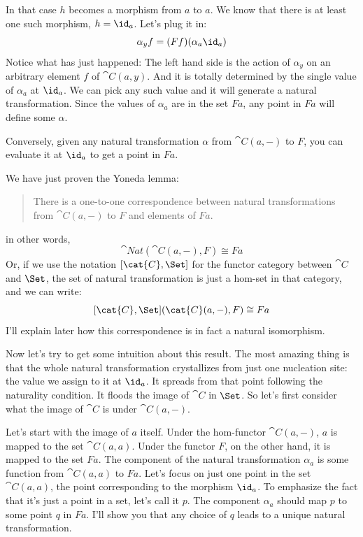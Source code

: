 \noindent
In that case $h$ becomes a morphism from $a$ to
$a$. We know that there is at least one such morphism,
$h = \id_a$. Let's plug it in:
\[\alpha_y f = (F f) (\alpha_a \id_a)\]
Notice what has just happened: The left hand side is the action of
$\alpha_y$ on an arbitrary element $f$ of $\cat{C}(a, y)$. And
it is totally determined by the single value of $\alpha_a$ at
$\id_a$. We can pick any such value and it will generate a natural
transformation. Since the values of $\alpha_a$ are in the set
$F a$, any point in $F a$ will define some $\alpha$.

Conversely, given any natural transformation $\alpha$ from
$\cat{C}(a, -)$ to $F$, you can evaluate it at $\id_a$ to
get a point in $F a$.

We have just proven the Yoneda lemma:

\begin{quote}
There is a one-to-one correspondence between natural transformations
from $\cat{C}(a, -)$ to $F$ and elements of $F a$. 
\end{quote}
in other words,
\[\cat{Nat}(\cat{C}(a, -), F) \cong F a\]
Or, if we use the notation $[\cat{C}, \Set]$ for the functor
category between $\cat{C}$ and $\Set$, the set of natural
transformation is just a hom-set in that category, and we can write:
\[[\cat{C}, \Set](\cat{C}(a, -), F) \cong F a\]
I'll explain later how this correspondence is in fact a natural
isomorphism.

Now let's try to get some intuition about this result. The most amazing
thing is that the whole natural transformation crystallizes from just
one nucleation site: the value we assign to it at $\id_a$. It
spreads from that point following the naturality condition. It floods
the image of $\cat{C}$ in $\Set$. So let's first consider what the
image of $\cat{C}$ is under $\cat{C}(a, -)$.

Let's start with the image of $a$ itself. Under the hom-functor
$\cat{C}(a, -)$, $a$ is mapped to the set $\cat{C}(a, a)$.
Under the functor $F$, on the other hand, it is mapped to the set
$F a$. The component of the natural transformation $\alpha_a$
is some function from $\cat{C}(a, a)$ to $F a$. Let's focus on
just one point in the set $\cat{C}(a, a)$, the point corresponding to
the morphism $\id_a$. To emphasize the fact that it's just a point
in a set, let's call it $p$. The component $\alpha_a$ should map
$p$ to some point $q$ in $F a$. I'll show you that
any choice of $q$ leads to a unique natural transformation.

